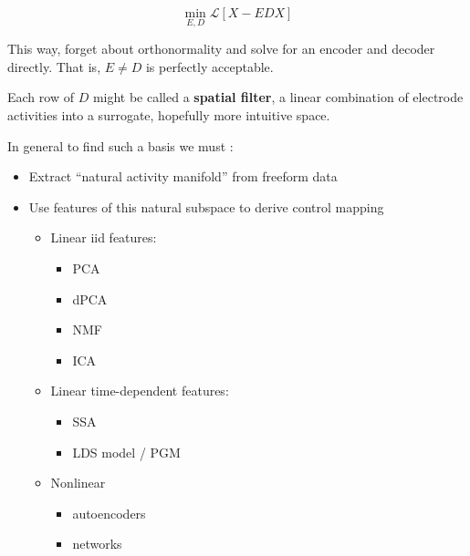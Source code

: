 {            \[
            \min_{E,D}{\mathcal{L}\left[X - EDX\right]}
            \]

            This way, forget about orthonormality and solve for an
            encoder and decoder directly. That is, \(E\neq{D}\) is
            perfectly acceptable.

            Each row of \(D\) might be called a \textbf{spatial filter},
            a linear combination of electrode activities into a
            surrogate, hopefully more intuitive space.

            In general to find such a basis we must :

            \begin{itemize}
            \tightlist
            \item
              Extract ``natural activity manifold'' from freeform data
            \item
              Use features of this natural subspace to derive control
              mapping

              \begin{itemize}
              \tightlist
              \item
                Linear iid features:

                \begin{itemize}
                \tightlist
                \item
                  PCA
                \item
                  dPCA
                \item
                  NMF
                \item
                  ICA
                \end{itemize}
              \item
                Linear time-dependent features:

                \begin{itemize}
                \tightlist
                \item
                  SSA
                \item
                  LDS model / PGM
                \end{itemize}
              \item
                Nonlinear

                \begin{itemize}
                \tightlist
                \item
                  autoencoders
                \item
                  networks
                \end{itemize}
              \end{itemize}
            \end{itemize}

}
